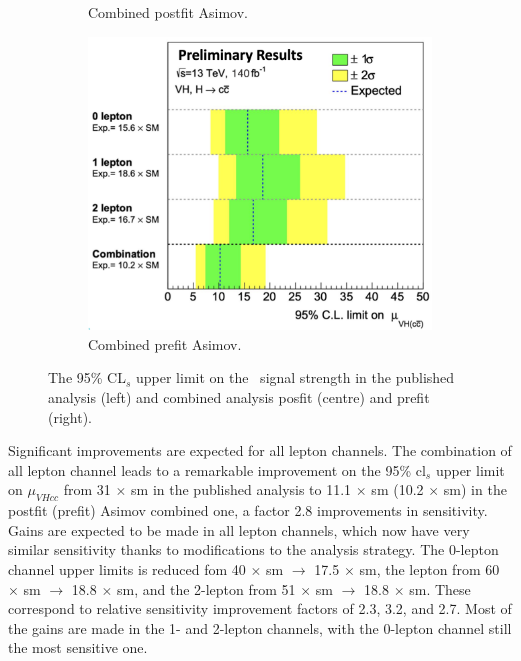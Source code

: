 \begin{figure}[h!]
\begin{subfigure}[b]{0.32\textwidth}
        \caption{Combined postfit Asimov.}
        \label{fig:fit_new_vhcclimitPostfit}
    \end{subfigure}
    \begin{subfigure}[b]{0.32\textwidth}
      \centering
      \includegraphics[width=\textwidth]{Images/VH/Fit/fromSlides/prefitVHcc.png}
      \caption{Combined prefit Asimov.}
      \label{fig:fit_new_vhcclimitPrefit}
  \end{subfigure}
    \caption{The 95\% CL$_s$ upper limit on the \vhc\ signal strength in the published analysis (left) and combined analysis posfit (centre) and prefit (right).}
    \label{fig:fit_vhcc_limits}
\end{figure} 

Significant improvements are expected for all lepton channels. The combination of all lepton channel leads to a remarkable improvement on the 95\% \gls{cl}$_s$ upper limit on $\mu_{VHcc}$ from 31 $\times$ \gls{sm} in the published analysis to 11.1 $\times$ \gls{sm} (10.2 $\times$ \gls{sm}) in the postfit (prefit) Asimov combined one, a factor 2.8 improvements in sensitivity. Gains are expected to be made in all lepton channels, which now have very similar sensitivity thanks to modifications to the analysis strategy. The 0-lepton channel upper limits is reduced fom 40 $\times$ \gls{sm} $\rightarrow$ 17.5 $\times$ \gls{sm}, the lepton from 60 $\times$ \gls{sm} $\rightarrow$ 18.8 $\times$ \gls{sm}, and the 2-lepton from 51 $\times$ \gls{sm} $\rightarrow$ 18.8 $\times$ \gls{sm}. These correspond to relative sensitivity improvement factors of 2.3, 3.2, and 2.7. Most of the gains are made in the 1- and 2-lepton channels, with the 0-lepton channel still the most sensitive one.

